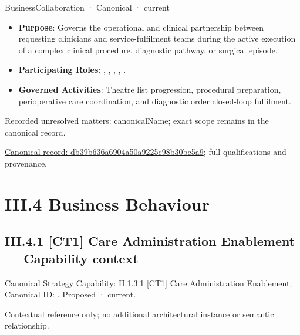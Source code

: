 \label{element:db39b636a6904a50a9225c98b30bc5a9}
{\small BusinessCollaboration · Canonical · current}\par

\begin{itemize}


\item \textbf{Purpose}: Governs the operational and clinical partnership between requesting clinicians and service-fulfilment teams during the active execution of a complex clinical procedure, diagnostic pathway, or surgical episode.

\item \textbf{Participating Roles}: \texttt{}, \texttt{}, \texttt{}, \texttt{}, \texttt{}.

\item \textbf{Governed Activities}: Theatre list progression, procedural preparation, perioperative care coordination, and diagnostic order closed-loop fulfilment.

\end{itemize}

{\small Recorded unresolved matters: canonicalName; exact scope remains in the canonical record.}\par
{\footnotesize \href{../../../../continuum/business/business-collaboration/db39b636a6904a50a9225c98b30bc5a9.md}{Canonical record: db39b636a6904a50a9225c98b30bc5a9}; full qualifications and provenance.}\par
\chapter*{III.4 Business Behaviour}
\label{navigation:III.4}

\section*{III.4.1 [CT1] Care Administration Enablement — Capability context}
\label{navigation:III.4.1}

{\small Canonical Strategy Capability: II.1.3.1 \hyperref[element:28df27d55c514a37995145ab46945f78]{[CT1] Care Administration Enablement}; Canonical ID: \texttt{}. Proposed · current.}\par
Contextual reference only; no additional architectural instance or semantic relationship.\par
